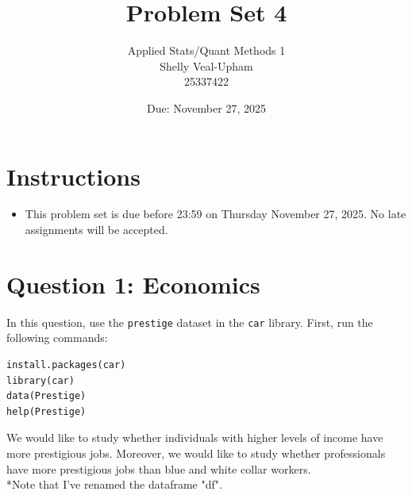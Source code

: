 \documentclass[12pt,letterpaper]{article}
\title{Problem Set 4}
\date{Due: November 27, 2025}
\author{Applied Stats/Quant Methods 1\\
	Shelly Veal-Upham\\
	25337422}
\begin{document}
	\maketitle
	\section*{Instructions}
	\begin{itemize}
		\item This problem set is due before 23:59 on Thursday November 27, 2025. No late assignments will be accepted.
	\end{itemize}

	\vspace{.5cm}
\section*{Question 1: Economics}
\vspace{.25cm}
\noindent 	
In this question, use the \texttt{prestige} dataset in the \texttt{car} library. First, run the following commands:

\begin{verbatim}
install.packages(car)
library(car)
data(Prestige)
help(Prestige)
\end{verbatim} 


\noindent We would like to study whether individuals with higher levels of income have more prestigious jobs. Moreover, we would like to study whether professionals have more prestigious jobs than blue and white collar workers.\\

\vspace{.1cm}
*Note that I've renamed the dataframe "df".
\end{document}
